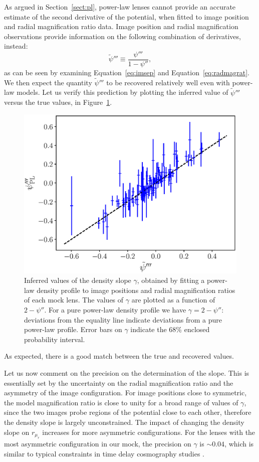 \documentclass[usenatbib]{mnras}
\def\psiii{\psi''}
\def\psiiii{\psi'''}
\def\psicomb{\tilde{\psi}'''}
\def\radmagrat{r_{\mu_r}}
\def\Sref#1{Section~\ref{#1}\xspace}
\def\Fref#1{Figure~\ref{#1}\xspace}
\def\Eref#1{Equation~\ref{#1}\xspace}
\begin{document}
As argued in \Sref{sect:pl}, power-law lenses cannot provide an accurate estimate of the second derivative of the potential, when fitted to image position and radial magnification ratio data.
Image position and radial magnification observations provide information on the following combination of derivatives, instead:
\begin{equation}\label{eq:psicomb}
\psicomb \equiv \frac{\psiiii}{1 - \psiii},
\end{equation}
as can be seen by examining \Eref{eq:imsep} and \Eref{eq:radmagrat}.
We then expect the quantity $\psicomb$ to be recovered relatively well even with power-law models. Let us verify this prediction by plotting the inferred value of $\psicomb$ versus the true values, in \Fref{fig:psicomb}.
%
\begin{figure}
 \includegraphics[width=\columnwidth]{psicomb.eps}
 \caption{
Inferred values of the density slope $\gamma$, obtained by fitting a power-law density profile to image positions and radial magnification ratios of each mock lens. The values of $\gamma$ are plotted as a function of $2-\psiii$. For a pure power-law density profile we have $\gamma = 2-\psiii$: deviations from the equality line indicate deviations from a pure power-law profile.
Error bars on $\gamma$ indicate the 68\% enclosed probability interval.
}
 \label{fig:psicomb}
\end{figure}
%
As expected, there is a good match between the true and recovered values.

Let us now comment on the precision on the determination of the slope.
This is essentially set by the uncertainty on the radial magnification ratio and the asymmetry of the image configuration. For image positions close to symmetric, the model magnification ratio is close to unity for a broad range of values of $\gamma$, since the two images probe regions of the potential close to each other, therefore the density slope is largely unconstrained. The impact of changing the density slope on $\radmagrat$ increases for more asymmetric configurations.
For the lenses with the most asymmetric configuration in our mock, the precision on $\gamma$ is $\sim0.04$, which is similar to typical constraints in time delay cosmography studies \citep[see e.g.]{Suy++13}.
\end{document}
